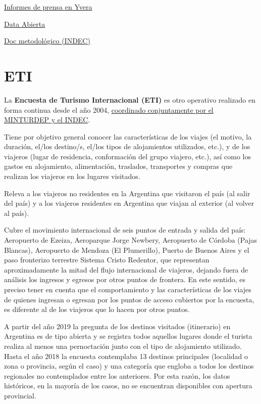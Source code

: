 \documentclass[
  openany]{book}
\begin{document}
\href{https://www.yvera.tur.ar/estadistica/info/encuesta-de-ocupacion-hotelera-eoh}{Informes de prensa en Yvera}

\href{http://datos.yvera.tur.ar/dataset/encuesta-ocupacion-hotelera-parahotelera-eoh}{Data Abierta}

\href{https://www.indec.gob.ar/ftp/cuadros/economia/eoh_aspectos_metodologicos.pdf}{Doc metodológico (INDEC)}

\hypertarget{eti}{%
\section{ETI}\label{eti}}

La \textbf{Encuesta de Turismo Internacional (ETI)} es otro operativo realizado en forma continua desde el año 2004, \href{https://www.indec.gob.ar/indec/web/Nivel4-Tema-3-13-55}{coordinado conjuntamente por el MINTURDEP y el INDEC}.

Tiene por objetivo general conocer las características de los viajes (el motivo, la duración, el/los destino/s, el/los tipos de alojamientos utilizados, etc.), y de los viajeros (lugar de residencia, conformación del grupo viajero, etc.), así como los gastos en alojamiento, alimentación, traslados, transportes y compras que realizan los viajeros en los lugares visitados.

Releva a los viajeros no residentes en la Argentina que visitaron el país (al salir del país) y a los viajeros residentes en Argentina que viajan al exterior (al volver al país).

Cubre el movimiento internacional de seis puntos de entrada y salida del país: Aeropuerto de Ezeiza, Aeroparque Jorge Newbery, Aeropuerto de Córdoba (Pajas Blancas), Aeropuerto de Mendoza (El Plumerillo), Puerto de Buenos Aires y el paso fronterizo terrestre Sistema Cristo Redentor, que representan aproximadamente la mitad del flujo internacional de viajeros, dejando fuera de análisis los ingresos y egresos por otros puntos de frontera.
En este sentido, es preciso tener en cuenta que el comportamiento y las características de los viajes de quienes ingresan o egresan por los puntos de acceso cubiertos por la encuesta, es diferente al de los viajeros que lo hacen por otros puntos.

A partir del año 2019 la pregunta de los destinos visitados (itinerario) en Argentina es de tipo abierta y se registra todos aquellos lugares donde el turista realiza al menos una pernoctación junto con el tipo de alojamiento utilizado.
Hasta el año 2018 la encuesta contemplaba 13 destinos principales (localidad o zona o provincia, según el caso) y una categoría que engloba a todos los destinos regionales no contemplados entre los anteriores.
Por esta razón, los datos históricos, en la mayoría de los casos, no se encuentran disponibles con apertura provincial.
\end{document}

